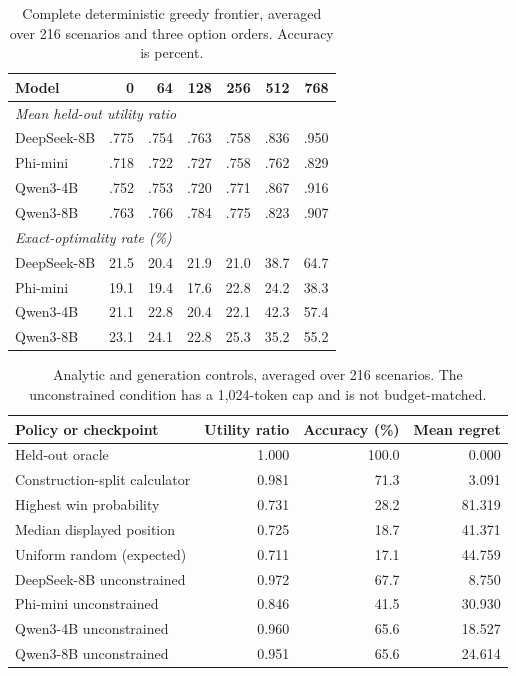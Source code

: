 \begin{table}[H]
\centering
\caption{Complete deterministic greedy frontier, averaged over 216 scenarios and three option orders. Accuracy is percent.}
\label{tab:fullgreedy}
\scriptsize
\setlength{\tabcolsep}{2.6pt}
\begin{tabular}{lrrrrrr}
\toprule
Model & 0 & 64 & 128 & 256 & 512 & 768 \\
\midrule
\multicolumn{7}{l}{\emph{Mean held-out utility ratio}}\\
DeepSeek-8B & .775 & .754 & .763 & .758 & .836 & .950 \\
Phi-mini & .718 & .722 & .727 & .758 & .762 & .829 \\
Qwen3-4B & .752 & .753 & .720 & .771 & .867 & .916 \\
Qwen3-8B & .763 & .766 & .784 & .775 & .823 & .907 \\
\midrule
\multicolumn{7}{l}{\emph{Exact-optimality rate (\%)}}\\
DeepSeek-8B & 21.5 & 20.4 & 21.9 & 21.0 & 38.7 & 64.7 \\
Phi-mini & 19.1 & 19.4 & 17.6 & 22.8 & 24.2 & 38.3 \\
Qwen3-4B & 21.1 & 22.8 & 20.4 & 22.1 & 42.3 & 57.4 \\
Qwen3-8B & 23.1 & 24.1 & 22.8 & 25.3 & 35.2 & 55.2 \\
\bottomrule
\end{tabular}
\end{table}

\begin{table}[H]
\centering
\caption{Analytic and generation controls, averaged over 216 scenarios. The unconstrained condition has a 1,024-token cap and is not budget-matched.}
\label{tab:baselines}
\small
\setlength{\tabcolsep}{4pt}
\begin{tabular}{lrrr}
\toprule
Policy or checkpoint & Utility ratio & Accuracy (\%) & Mean regret \\
\midrule
Held-out oracle & 1.000 & 100.0 & 0.000 \\
Construction-split calculator & 0.981 & 71.3 & 3.091 \\
Highest win probability & 0.731 & 28.2 & 81.319 \\
Median displayed position & 0.725 & 18.7 & 41.371 \\
Uniform random (expected) & 0.711 & 17.1 & 44.759 \\
\midrule
DeepSeek-8B unconstrained & 0.972 & 67.7 & 8.750 \\
Phi-mini unconstrained & 0.846 & 41.5 & 30.930 \\
Qwen3-4B unconstrained & 0.960 & 65.6 & 18.527 \\
Qwen3-8B unconstrained & 0.951 & 65.6 & 24.614 \\
\bottomrule
\end{tabular}
\end{table}

